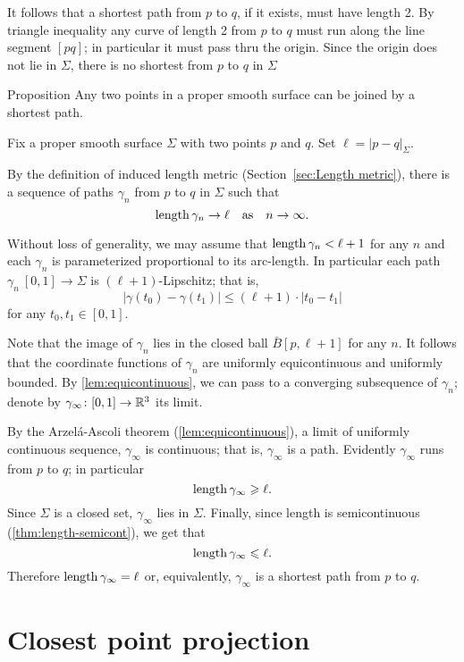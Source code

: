 It follows that a shortest path from $p$ to $q$, if it exists, must have length 2.
By triangle inequality any curve of length 2 from $p$ to $q$ must run along the line segment $[pq]$;
in particular it must pass thru the origin.
Since the origin does not lie in $\Sigma$, there is no shortest from $p$ to $q$ in $\Sigma$ 
\qeds

\begin{thm}{Proposition}\label{prop:shortest-paths-exist}
Any two points in a proper smooth surface can be joined by a shortest path. 
\end{thm}

Fix a proper smooth surface $\Sigma$ with two points $p$ and $q$.
Set $\ell=|p-q|_\Sigma$.

By the definition of induced length metric (Section~\ref{sec:Length metric}),
there is a sequence of paths $\gamma_n$ from $p$ to $q$ in $\Sigma$ such that
\[\mathop{\rm length}\nolimits\gamma_n\to \ell\quad\text{as}\quad n\to \infty.\]

Without loss of generality, we may assume that $\mathop{\rm length}\nolimits\gamma_n<\ell+1$ for any $n$ and each $\gamma_n$ is parameterized proportional to its arc-length.
In particular each path $\gamma_n\:[0,1]\to\Sigma$ is $(\ell+1)$-Lipschitz; 
that is,
\[|\gamma(t_0)-\gamma(t_1)|\le (\ell+1)\cdot|t_0-t_1|\]
for any $t_0,t_1\in[0,1]$.

Note that the image of $\gamma_n$ lies in the closed ball $\bar B[p,\ell+1]$ for any $n$.
It follows that the coordinate functions of $\gamma_n$ are uniformly equicontinuous and uniformly bounded.
By \ref{lem:equicontinuous}, we can pass to a converging subsequence of $\gamma_n$;
denote by $\gamma_\infty\colon[0,1]\to\mathbb{R}^3$ its limit.

By the Arzel\'{a}-Ascoli theorem (\ref{lem:equicontinuous}),
a limit of uniformly continuous sequence, $\gamma_\infty$ is continuous;
that is, $\gamma_\infty$ is a path.
Evidently $\gamma_\infty$ runs from $p$ to $q$;
in particular
\[\mathop{\rm length}\nolimits\gamma_\infty\geqslant \ell.\]
Since $\Sigma$ is a closed set, $\gamma_\infty$ lies in $\Sigma$.
Finally, since length is semicontinuous (\ref{thm:length-semicont}), we get that
\[\mathop{\rm length}\nolimits\gamma_\infty\leqslant \ell.\]
Therefore $\mathop{\rm length}\nolimits\gamma_\infty= \ell$ or, equivalently, $\gamma_\infty$ is a shortest path from $p$ to $q$.
\qeds

\section{Closest point projection}\label{sec:closest-point-projection}

